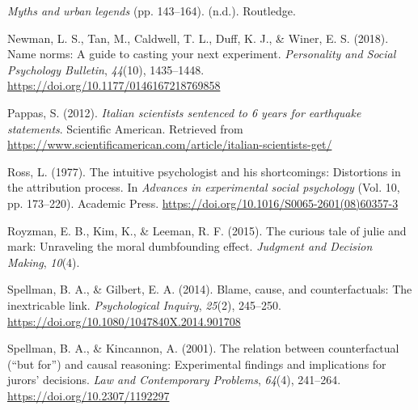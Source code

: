 \documentclass[
  man,floatsintext]{apa6}
\newlength{\cslhangindent}
\newlength{\cslentryspacingunit} %
\newenvironment{CSLReferences}[2] %
 {%
  \setlength{\parindent}{0pt}
  \ifodd #1
  \let\oldpar\par
  \def\par{\hangindent=\cslhangindent\oldpar}
  \fi
  \setlength{\parskip}{#2\cslentryspacingunit}
 }%
 {}
\begin{document}
\begin{CSLReferences}{1}{0}
\leavevmode{}%
\emph{Myths and urban legends} (pp. 143--164). (n.d.). Routledge.

\leavevmode{}%
Newman, L. S., Tan, M., Caldwell, T. L., Duff, K. J., \& Winer, E. S. (2018). Name norms: A guide to casting your next experiment. \emph{Personality and Social Psychology Bulletin}, \emph{44}(10), 1435--1448. \url{https://doi.org/10.1177/0146167218769858}

\leavevmode{}%
Pappas, S. (2012). \emph{Italian scientists sentenced to 6 years for earthquake statements}. Scientific American. Retrieved from \url{https://www.scientificamerican.com/article/italian-scientists-get/}

\leavevmode{}%
Ross, L. (1977). The intuitive psychologist and his shortcomings: Distortions in the attribution process. In \emph{Advances in experimental social psychology} (Vol. 10, pp. 173--220). Academic Press. \url{https://doi.org/10.1016/S0065-2601(08)60357-3}

\leavevmode{}%
Royzman, E. B., Kim, K., \& Leeman, R. F. (2015). The curious tale of julie and mark: Unraveling the moral dumbfounding effect. \emph{Judgment and Decision Making}, \emph{10}(4).

\leavevmode{}%
Spellman, B. A., \& Gilbert, E. A. (2014). Blame, cause, and counterfactuals: The inextricable link. \emph{Psychological Inquiry}, \emph{25}(2), 245--250. \url{https://doi.org/10.1080/1047840X.2014.901708}

\leavevmode{}%
Spellman, B. A., \& Kincannon, A. (2001). The relation between counterfactual ({``but for''}) and causal reasoning: Experimental findings and implications for jurors' decisions. \emph{Law and Contemporary Problems}, \emph{64}(4), 241--264. \url{https://doi.org/10.2307/1192297}

\end{CSLReferences}
\end{document}
